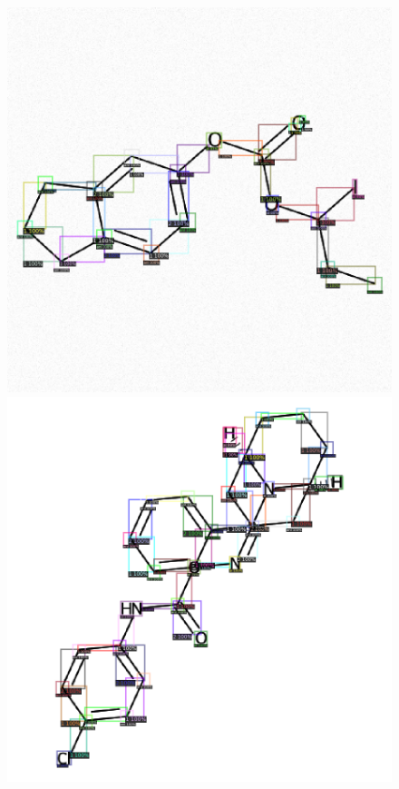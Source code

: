 \begin{figure}[ht!] 
	\center
	\includegraphics [scale=0.25] {my_folder/images/inference1}
	\includegraphics [scale=0.25] {my_folder/images/inference2}

\end{figure}
